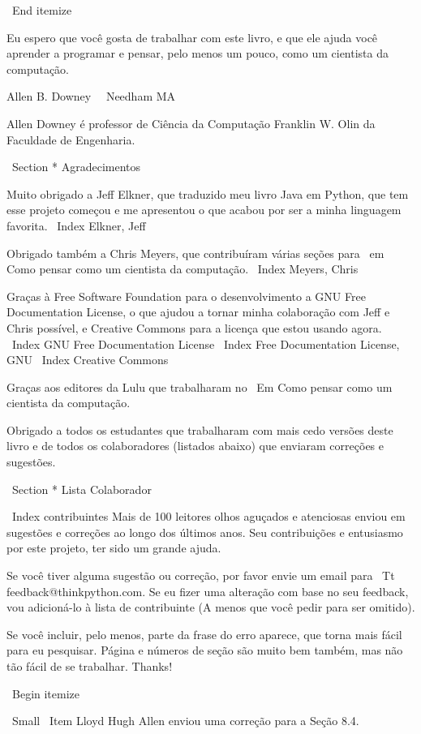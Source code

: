\documentclass[10pt]{book}
\begin{document}
\ End {itemize}

Eu espero que você gosta de trabalhar com este livro, e que ele ajuda
você aprender a programar e pensar, pelo menos um pouco, como
um cientista da computação.


Allen B. Downey \ \
Needham MA \ \

Allen Downey é professor de Ciência da Computação 
Franklin W. Olin da Faculdade de Engenharia.


\ Section * {Agradecimentos}

Muito obrigado a Jeff Elkner, que
traduzido meu livro Java em Python, que tem esse projeto
começou e me apresentou o que acabou por ser a minha
linguagem favorita.
\ Index {Elkner, Jeff}

Obrigado também a Chris Meyers, que contribuíram várias seções
para {\ em Como pensar como um cientista da computação}.
\ Index {Meyers, Chris}

Graças à Free Software Foundation para o desenvolvimento
a GNU Free Documentation License, o que ajudou a tornar
minha colaboração com Jeff e Chris possível, e Creative
Commons para a licença que estou usando agora.
\ Index {GNU Free Documentation License}
\ Index {Free Documentation License, GNU}
\ Index {Creative Commons}

Graças aos editores da Lulu que trabalharam no
{\ Em Como pensar como um cientista da computação}.

Obrigado a todos os estudantes que trabalharam com mais cedo
versões deste livro e de todos os colaboradores (listados
abaixo) que enviaram correções e sugestões.


\ Section * {Lista Colaborador}

\ Index {} contribuintes
Mais de 100 leitores olhos aguçados e atenciosas enviou em
sugestões e correções ao longo dos últimos anos. Seu
contribuições e entusiasmo por este projeto, ter sido um
grande ajuda.

Se você tiver alguma sugestão ou correção, por favor envie um email para 
{\ Tt feedback@thinkpython.com}. Se eu fizer uma alteração com base no seu
feedback, vou adicioná-lo à lista de contribuinte
(A menos que você pedir para ser omitido).

Se você incluir, pelo menos, parte da frase do
erro aparece, que torna mais fácil para eu pesquisar. Página e
números de seção são muito bem também, mas não tão fácil de se trabalhar.
Thanks!

\ Begin {itemize}

\ Small
\ Item Lloyd Hugh Allen enviou uma correção para a Seção 8.4.
\end{document}
